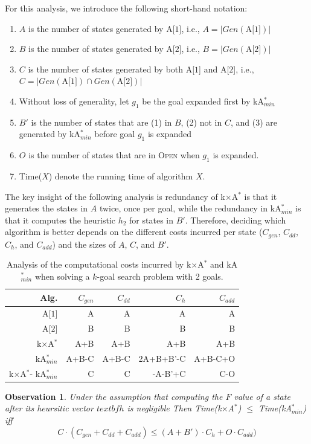 \documentclass{aicom2e}
\newtheorem{observation}{Observation}
\newcommand{\kgs}{$k$-goal search}
\newcommand{\kastarmin}{kA$^*_{min}$}
\newcommand{\kxastar}{k$\times$A$^*$}
\newcommand{\astari}[1]{A[$#1$]}
\newcommand{\open}{\textsc{Open}}
\begin{document}
For this analysis, we introduce the following short-hand notation:
\begin{enumerate}
	\item $A$ is the number of states generated by \astari{1}, i.e., 
		$A=|Gen(\text{\astari{1}})|$
	\item $B$ is the number of states generated by \astari{2}, i.e., 
		$B=|Gen(\text{\astari{2}})|$
	\item $C$ is the number of states generated by both \astari{1} and \astari{2}, i.e., 
		$C=|Gen(\text{\astari{1}})\cap Gen(\text{\astari{2}})|$	
	\item Without loss of generality, let $g_1$ be the goal expanded first by \kastarmin{}		
	\item $B'$ is the number of states that are (1) in $B$, (2) not in $C$, 
		and (3) are generated by \kastarmin{} before goal $g_1$ is expanded
	\item $O$ is the number of states that are in \open{} when $g_1$ is expanded. 
	\item Time($X$) denote the running time of algorithm $X$. 
\end{enumerate}
The key insight of the following analysis is redundancy of \kxastar{} is that it generates the states in $A$ twice, once per goal, while the redundancy in \kastarmin{} is that it computes the heuristic $h_2$ for states in $B'$. 
Therefore, deciding which algorithm is better depends on the different costs incurred per state 
($C_{gen}$, $C_{dd}$, $C_{h}$, and $C_{add}$) and the sizes of $A$, $C$, and $B'$. 
\begin{table}
	\begin{tabular}{|r|r|r|r|r|}
		\hline
		Alg.		& $C_{gen}$ & $C_{dd}$ 	& $C_{h}$ & $C_{add}$ \\			\hline
		\astari{1}	& A			& A			&  A	  &  A  \\
		\astari{2}	& B			& B			&  B	  &  B  \\
		\kxastar{}	& Aּ+B 		 & A+B		 &  A+B	   &  A+B  \\
		\kastarmin{}& A+B-C		& A+B-C		&  2A+B+B'-C&  A+B-C+O \\			\hline \hline
		\kxastar{}-
		\kastarmin{} & C & C & -A-B'+C & C-O \\\hline
	\end{tabular}
	\caption{Analysis of the computational costs incurred by \kxastar{} and \kastarmin{} 
		when solving a \kgs{} problem with 2 goals.}
	\label{tab:analysis-k-2}	
\end{table}
\begin{observation}
	Under the assumption that computing the $F$ value of a state 
	after its heursitic vector $textbf{h}$ is negligible
	Then Time(\kxastar{}) $\leq$ Time(\kastarmin{}) iff
	\[ C\cdot (C_{gen}+C_{dd}+C_{add}) \leq (A+B')\cdot C_{h}+O\cdot C_{add}) \]
\end{observation}
\end{document}
